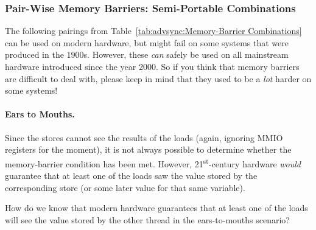 \subsubsection{Pair-Wise Memory Barriers: Semi-Portable Combinations}

The following pairings from
Table~\ref{tab:advsync:Memory-Barrier Combinations}
can be used on modern hardware, but might fail on some systems
that were produced in the 1900s.
However, these \emph{can} safely be used on all mainstream hardware
introduced since the year 2000.
So if you think that memory barriers are difficult to deal with, please
keep in mind that they used to be a \emph{lot} harder on some systems!

\paragraph{Ears to Mouths.}
	Since the stores cannot see the results of the loads
	(again, ignoring MMIO registers for the moment),
	it is not always possible to determine whether the memory-barrier
	condition has been met.
	However, 21\textsuperscript{st}-century
	hardware \emph{would} guarantee that at least one
	of the loads saw the value stored by the corresponding store
	(or some later value for that same variable).

\QuickQuiz{}
	How do we know that modern hardware guarantees that at least
	one of the loads will see the value stored by the other thread
	in the ears-to-mouths scenario?
 \QuickQuizEnd

